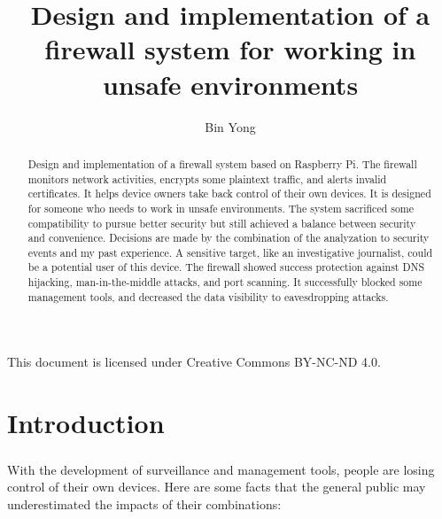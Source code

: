 \documentclass[mscthesis]{usiinfthesis}
\title{Design and implementation of a firewall system for working in unsafe environments} %
\author{Bin Yong} %
\begin{document}

\maketitle %

\frontmatter %

\begin{abstract}
  \paragraph{}
  Design and implementation of a firewall system based on Raspberry Pi. The firewall monitors network activities, encrypts some plaintext traffic, and alerts invalid certificates. It helps device owners take back control of their own devices. It is designed for someone who needs to work in unsafe environments. The system sacrificed some compatibility to pursue better security but still achieved a balance between security and convenience. Decisions are made by the combination of the analyzation to security events and my past experience. A sensitive target, like an investigative journalist, could be a potential user of this device. The firewall showed success protection against DNS hijacking, man-in-the-middle attacks, and port scanning. It successfully blocked some management tools, and decreased the data visibility to eavesdropping attacks.
\end{abstract}

\begin{acknowledgements}
  \paragraph{}
  This document is licensed under Creative Commons BY-NC-ND 4.0.
\end{acknowledgements}

\tableofcontents
\listoffigures %
\listoftables %

\mainmatter

\chapter{Introduction}
\paragraph{}
With the development of surveillance and management tools, people are losing control of their own devices. Here are some facts that the general public may underestimated the impacts of their combinations:
\end{document}

